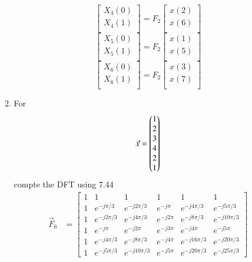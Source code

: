 \documentclass[journal,12pt,twocolumn]{IEEEtran}
\renewcommand\thesection{\arabic{section}}
\begin{document}
\begin{enumerate}[label=\thesection.\arabic*]
\begin{enumerate}[label=\arabic*.,ref=\thesection.\theenumi]
\begin{equation}
       \begin{bmatrix}
         X_{4}(0) \\ 
         X_{4}(1)\\ 
       \end{bmatrix}
       = F_{2}
       \begin{bmatrix}
         x(2) \\ 
         x(6) \\ 
       \end{bmatrix}
     \end{equation}
     \begin{equation}
       \begin{bmatrix}
         X_{5}(0) \\ 
         X_{5}(1)\\ 
       \end{bmatrix}
       = F_{2}
       \begin{bmatrix}
         x(1) \\ 
         x(5) \\ 
       \end{bmatrix}
     \end{equation}
     \begin{equation}
       \begin{bmatrix}
         X_{6}(0) \\ 
         X_{6}(1)\\ 
       \end{bmatrix}
       = F_{2}
       \begin{bmatrix}
         x(3) \\ 
         x(7) \\ 
       \end{bmatrix}
     \end{equation}
     \item For 
     \begin{align}
       \vec{x} = \begin{pmatrix}1\\2\\3\\4\\2\\1\end{pmatrix}
       \label{eq:equation1}
     \end{align}
     compte the DFT  
     using 
     7.44
     \solution \begin{align}
       \vec{F}_6&=\begin{bmatrix}
         1&1&1&1&1&1\\1&e^{-j \pi/3 }&e^{-j 2 \pi/3 }&e^{-j \pi }&e^{-j 4 \pi/3 }&e^{-j 5 \pi/3 }\\1&e^{-j 2 \pi/3 }&e^{-j 4 \pi/3 }&e^{-j 2 \pi }&e^{-j 8\pi/3 }&e^{-j 10 \pi/3 }\\1&e^{-j \pi }&e^{-j 2 \pi }&e^{-j 3 \pi }&e^{-j 4 \pi }&e^{-j 5 \pi }\\1&e^{-j 4 \pi/3 }&e^{-j 8 \pi/3 }&e^{-j 4 \pi }&e^{-j 16 \pi/3 }&e^{-j 20 \pi/3 }\\1&e^{-j 5 \pi/3 }&e^{-j 10 \pi/3 }&e^{-j 5 \pi }&e^{-j 20 \pi/3 }&e^{-j 25 \pi/3 }
       \end{bmatrix}
     \end{align}
     

\end{enumerate}
\end{enumerate}
\end{document}

